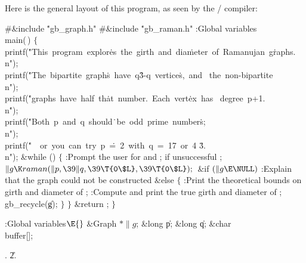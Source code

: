 \fi

Here is the general layout of this program, as seen by the \CEE/ compiler:

\Y\B\8\#\&{include} \.{"gb\_graph.h"}\6
\8\#\&{include} \.{"gb\_raman.h"}\6
\ATH\7
:Global variables\X\7
\1\1\\{main}(\,)\2\2\6
${}\{{}$\1\6
\\{printf}(\.{"This\ program\ explor}\)\.{es\ the\ girth\ and\ dia}\)\.{meter\
of\ Ramanujan\ g}\)\.{raphs.\\n"});\6
\\{printf}(\.{"The\ bipartite\ graph}\)\.{s\ have\ q\^3-q\ vertice}\)\.{s,\ and%
\ the\ non-bipar}\)\.{tite\\n"});\6
\\{printf}(\.{"graphs\ have\ half\ th}\)\.{at\ number.\ Each\ vert}\)\.{ex\ has%
\ degree\ p+1.\\n}\)\.{"});\6
\\{printf}(\.{"Both\ p\ and\ q\ should}\)\.{\ be\ odd\ prime\ number}\)\.{s;%
\\n"});\6
\\{printf}(\.{"\ \ or\ you\ can\ try\ p\ }\)\.{=\ 2\ with\ q\ =\ 17\ or\ 4}\)%
\.{3.\\n"});\6
\&{while} ()\5
${}\{{}$\1\6
:Prompt the user for  and ;  if unsuccessful%
\X;\6
${}\|g\K\\{raman}(\|p,\39\|q,\39\T{0\$L},\39\T{0\$L});{}$\6
\&{if} ${}(\|g\E\NULL){}$\1\5
:Explain that the graph could not be constructed\X\2\6
\&{else}\5
${}\{{}$\1\6
:Print the theoretical bounds on girth and diameter of \X;\6
\X12:Compute and print the true girth and diameter of \PB{\|g}\X;\6
\\{gb\_recycle}(\|g);\6
\4${}\}{}$\2\6
\4${}\}{}$\2\6
\&{return} ;\6
\4${}\}{}$\2\par
\fi

\B{}:Global variables\X${}\E{}$\6
\&{Graph} ${}{*}\|g{}$;\6
\&{long} \|p;\6
\&{long} \|q;\6
\&{char} \\{buffer}[];\par
\A11.
\U2.\fi

